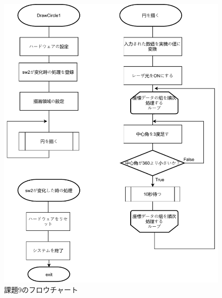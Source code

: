 \documentclass{jarticle}
\begin{document}
\begin{figure}[H]
    \centering
    \includegraphics[scale=0.6]{kumikomiKadai9.pdf}
    \caption{課題9のフロウチャート}
    \label{fig:my_label}
\end{figure}
\end{document}
